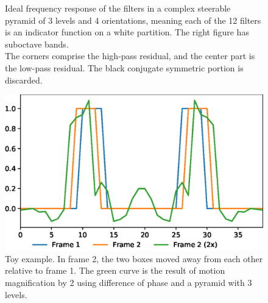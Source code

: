 \documentclass[aspectratio=43]{beamer}
\newcommand{\sidebysidecaption}[4]{%
\RaggedRight%
  \begin{minipage}[t]{#1}
    \vspace*{0pt}
    #3
  \end{minipage}
  \hfill%
  \begin{minipage}[t]{#2}
    \vspace*{0pt}
    #4
\end{minipage}%
}
\begin{document}
\begin{frame}[t]
\begin{multicols}{2}
\begin{figure}[tb]
{}{  \vspace{-0.3em}\caption{Ideal frequency response of the filters in a complex steerable pyramid of 3 levels and 4 orientations, meaning each of the 12 filters is an indicator function on a white partition. The right figure has suboctave bands.\\ \vspace{0.5em}
  The corners comprise the high-pass residual, and the center part is the low-pass residual. The black conjugate symmetric portion is discarded.
  }
}
\end{figure}

\vfill\break
\columnbreak



\begin{figure}[tb]
\sidebysidecaption{0.61\columnwidth}{0.39\columnwidth}{%
\includegraphics[scale=1.6]{example.eps}%
}{%
\vspace{-0.3em}  \caption{Toy example.  In frame 2, the two boxes moved away from each other relative to frame 1.  The green curve is the result of motion magnification by 2 using difference of phase and a pyramid with 3 levels.
  }
}
\end{figure}





\end{multicols}
\end{frame}
\end{document}
